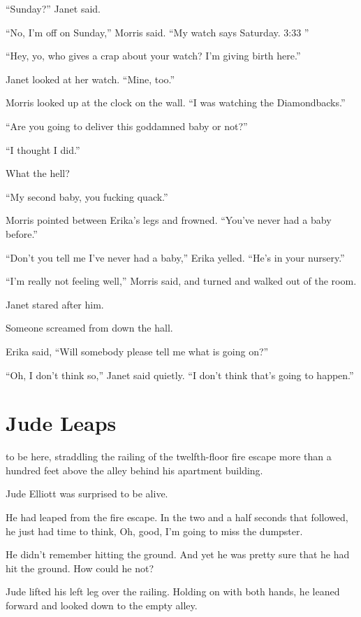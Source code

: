 “Sunday?” Janet said.

“No, I’m off on Sunday,” Morris said. “My watch says Saturday. 3:33 ”

“Hey, yo, who gives a crap about your watch? I’m giving birth here.”

Janet looked at her watch. “Mine, too.”

Morris looked up at the clock on the wall. “I was watching the Diamondbacks.”

“Are you going to deliver this goddamned baby or not?”

“I thought I did.”

What the hell?

“My second baby, you fucking quack.”

Morris pointed between Erika’s legs and frowned. “You’ve never had a baby before.”

“Don’t you tell me I’ve never had a baby,” Erika yelled. “He’s in your nursery.”

“I’m really not feeling well,” Morris said, and turned and walked out of the room.

Janet stared after him.

Someone screamed from down the hall.

Erika said, “Will somebody please tell me what is going on?”

“Oh, I don’t think so,” Janet said quietly. “I don’t think that’s going to happen.”



\chapter{Jude Leaps}

 to be here, straddling the railing of the twelfth-floor fire escape more than a hundred feet above the alley behind his apartment building.

Jude Elliott was surprised to be alive.

He had leaped from the fire escape. In the two and a half seconds that followed, he just had time to think, Oh, good, I’m going to miss the dumpster.

He didn’t remember hitting the ground. And yet he was pretty sure that he had hit the ground. How could he not?

Jude lifted his left leg over the railing. Holding on with both hands, he leaned forward and looked down to the empty alley.

